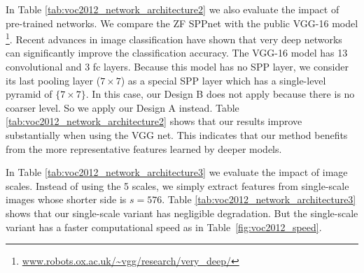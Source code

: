 \documentclass[10pt,twocolumn,letterpaper]{article}
\begin{document}
In Table \ref{tab:voc2012_network_architecture2} we also evaluate the impact of pre-trained networks.
We compare the ZF SPPnet with the public VGG-16 model \cite{simonyan2014very}\footnote{\url{www.robots.ox.ac.uk/~vgg/research/very_deep/}}.
Recent advances in image classification have shown that very deep networks \cite{simonyan2014very} can significantly improve the classification accuracy. The VGG-16 model has 13 convolutional and 3 fc layers. Because this model has no SPP layer, we consider its last pooling layer ($7\times7$) as a special SPP layer which has a single-level pyramid of $\{7 \times 7\}$. In this case, our Design B does not apply because there is no coarser level. So we apply our Design A instead. Table \ref{tab:voc2012_network_architecture2} shows that our results improve substantially when using the VGG net. This indicates that our method benefits from the more representative features learned by deeper models.

In Table \ref{tab:voc2012_network_architecture3} we evaluate the impact of image scales. Instead of using the 5 scales, we simply extract features from single-scale images whose shorter side is $s=576$. Table \ref{tab:voc2012_network_architecture3} shows that our single-scale variant has negligible degradation. But the single-scale variant has a faster computational speed as in Table~\ref{fig:voc2012_speed}.
\end{document}
